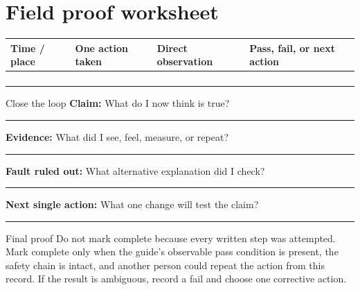\newpage
\section{Field proof worksheet}
\begin{tabularx}{\linewidth}{@{}p{.15\linewidth}p{.25\linewidth}p{.24\linewidth}L@{}}
\toprule
\textbf{Time / place}&\textbf{One action taken}&\textbf{Direct observation}&
\textbf{Pass, fail, or next action}\\
\midrule
&&&\\[1.1em]
&&&\\[1.1em]
&&&\\[1.1em]
&&&\\
\bottomrule
\end{tabularx}

\begin{teloscard}{Close the loop}
\textbf{Claim:} What do I now think is true?
\par\noindent\rule{\linewidth}{.4pt}

\smallskip
\textbf{Evidence:} What did I see, feel, measure, or repeat?
\par\noindent\rule{\linewidth}{.4pt}

\smallskip
\textbf{Fault ruled out:} What alternative explanation did I check?
\par\noindent\rule{\linewidth}{.4pt}

\smallskip
\textbf{Next single action:} What one change will test the claim?
\par\noindent\rule{\linewidth}{.4pt}
\end{teloscard}

\begin{telospanel}{Final proof}
Do not mark complete because every written step was attempted. Mark complete
only when the guide's observable pass condition is present, the safety chain
is intact, and another person could repeat the action from this record. If the
result is ambiguous, record a fail and choose one corrective action.
\end{telospanel}

